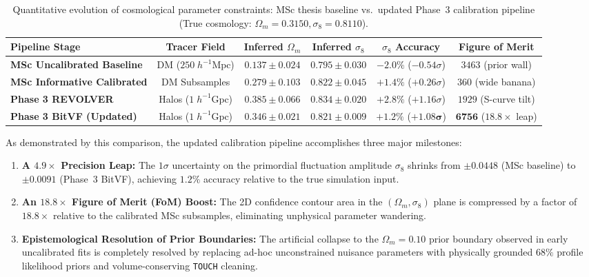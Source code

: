 \documentclass[12pt]{report}
\begin{document}
\begin{table}[H]
    \centering
    \caption{Quantitative evolution of cosmological parameter constraints: MSc thesis baseline vs.\ updated Phase~3 calibration pipeline (True cosmology: $\Omega_m = 0.3150, \sigma_8 = 0.8110$).}
    \label{tab:before_after_msc_comparison}
    \small
    \setlength{\tabcolsep}{4.5pt}
    \begin{tabular}{lccccc}
        \toprule
        \textbf{Pipeline Stage} & \textbf{Tracer Field} & \textbf{Inferred $\Omega_m$} & \textbf{Inferred $\sigma_8$} & $\sigma_8$ \textbf{Accuracy} & \textbf{Figure of Merit} \\
        \midrule
        \textbf{MSc Uncalibrated Baseline} & DM ($250\;h^{-1}\mathrm{Mpc}$) & $0.137 \pm 0.024$ & $0.795 \pm 0.030$ & $-2.0\%$ ($-0.54\sigma$) & $3463$ (prior wall) \\
        \textbf{MSc Informative Calibrated} & DM Subsamples & $0.279 \pm 0.103$ & $0.822 \pm 0.045$ & $+1.4\%$ ($+0.26\sigma$) & $360$ (wide banana) \\
        \midrule
        \textbf{Phase 3 REVOLVER} & Halos ($1\;h^{-1}\mathrm{Gpc}$) & $0.385 \pm 0.066$ & $0.834 \pm 0.020$ & $+2.8\%$ ($+1.16\sigma$) & $1929$ (S-curve tilt) \\
        \textbf{Phase 3 BitVF (Updated)} & Halos ($1\;h^{-1}\mathrm{Gpc}$) & $\mathbf{0.346 \pm 0.021}$ & $\mathbf{0.821 \pm 0.009}$ & $\mathbf{+1.2\%}$ ($\mathbf{+1.08\sigma}$) & $\mathbf{6756}$ ($\mathbf{18.8\times}$ leap) \\
        \bottomrule
    \end{tabular}
\end{table}

As demonstrated by this comparison, the updated calibration pipeline accomplishes three major milestones:
\begin{enumerate}
    \item \textbf{A $4.9\times$ Precision Leap:} The $1\sigma$ uncertainty on the primordial fluctuation amplitude $\sigma_8$ shrinks from $\pm 0.0448$ (MSc baseline) to $\pm 0.0091$ (Phase~3 BitVF), achieving $1.2\%$ accuracy relative to the true simulation input.
    \item \textbf{An $18.8\times$ Figure of Merit (FoM) Boost:} The 2D confidence contour area in the $(\Omega_m, \sigma_8)$ plane is compressed by a factor of $18.8\times$ relative to the calibrated MSc subsamples, eliminating unphysical parameter wandering.
    \item \textbf{Epistemological Resolution of Prior Boundaries:} The artificial collapse to the $\Omega_m = 0.10$ prior boundary observed in early uncalibrated fits is completely resolved by replacing ad-hoc unconstrained nuisance parameters with physically grounded $68\%$ profile likelihood priors and volume-conserving \texttt{TOUCH} cleaning.
\end{enumerate}
\end{document}
